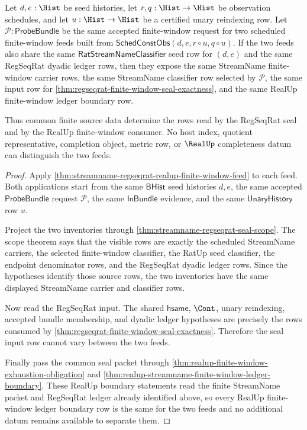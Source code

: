 \begin{theorem}
\label{thm:streamname-regseqrat-realup-feed-common-row-determinacy}
Let $d,e:\Hist$ be seed histories, let $r,q:\Hist\to\Hist$ be observation
schedules, and let $u:\Hist\to\Hist$ be a certified unary reindexing row. Let
$\mathcal{P}:\mathsf{ProbeBundle}$ be the same accepted finite-window request
for two scheduled finite-window feeds built from
$\mathsf{SchedConstObs}(d,e,r\circ u,q\circ u)$. If the two feeds also share the
same $\mathsf{RatStreamNameClassifier}$ seed row for $(d,e)$ and the same
RegSeqRat dyadic ledger rows, then they expose the same StreamName
finite-window carrier rows, the same StreamName classifier row selected by
$\mathcal{P}$, the same input row for
\autoref{thm:regseqrat-finite-window-seal-exactness}, and the same RealUp
finite-window ledger boundary row.

Thus common finite source data determine the rows read by the RegSeqRat seal
and by the RealUp finite-window consumer. No host index, quotient
representative, completion object, metric row, or $\RealUp$ completeness datum
can distinguish the two feeds.
\end{theorem}
\begin{proof}
Apply
\autoref{thm:streamname-regseqrat-realup-finite-window-feed} to each feed. Both
applications start from the same $\mathsf{BHist}$ seed histories $d,e$, the same
accepted $\mathsf{ProbeBundle}$ request $\mathcal{P}$, the same
$\mathsf{InBundle}$ evidence, and the same $\mathsf{UnaryHistory}$ row $u$.

Project the two inventories through
\autoref{thm:streamname-regseqrat-seal-scope}. The scope theorem says that the
visible rows are exactly the scheduled StreamName carriers, the selected
finite-window classifier, the RatUp seed classifier, the endpoint denominator
rows, and the RegSeqRat dyadic ledger rows. Since the hypotheses identify those
source rows, the two inventories have the same displayed StreamName carrier and
classifier rows.

Now read the RegSeqRat input. The shared $\mathsf{hsame}$, $\Cont$, unary
reindexing, accepted bundle membership, and dyadic ledger hypotheses are
precisely the rows consumed by
\autoref{thm:regseqrat-finite-window-seal-exactness}. Therefore the seal input
row cannot vary between the two feeds.

Finally pass the common seal packet through
\autoref{thm:realup-finite-window-exhaustion-obligation} and
\autoref{thm:realup-streamname-finite-window-ledger-boundary}. These RealUp
boundary statements read the finite StreamName packet and RegSeqRat ledger
already identified above, so every RealUp finite-window ledger boundary row is
the same for the two feeds and no additional datum remains available to
separate them.
\end{proof}

